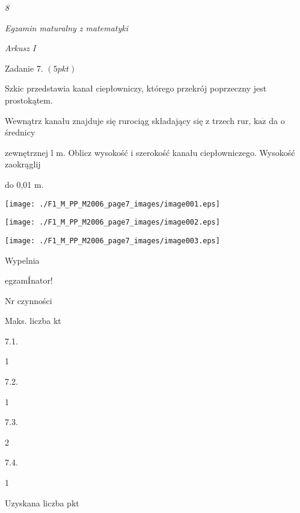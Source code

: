 \documentclass[a4paper,12pt]{article}
\begin{document}
{\it 8}

{\it Egzamin maturalny z matematyki}

{\it Arkusz I}

Zadanie 7. $(5pkt)$

Szkic przedstawia kanał ciepłowniczy, którego przekrój poprzeczny jest prostokątem.

Wewnątrz kanału znajduje się rurociąg składający się z trzech rur, $\mathrm{k}\mathrm{a}\dot{\mathrm{z}}$ da o średnicy

zewnętrznej l $\mathrm{m}$. Oblicz wysokość i szerokość kanału ciepłowniczego. Wysokość zaokrąglij

do 0,01 $\mathrm{m}.$
\begin{center}
\texttt{[image: ./F1\_M\_PP\_M2006\_page7\_images/image001.eps]}

\texttt{[image: ./F1\_M\_PP\_M2006\_page7\_images/image002.eps]}

\texttt{[image: ./F1\_M\_PP\_M2006\_page7\_images/image003.eps]}
\end{center}
Wypelnia

egzamÍnator!

Nr czynności

Maks. liczba kt

7.1.

1

7.2.

1

7.3.

2

7.4.

1

Uzyskana liczba pkt
\end{document}
